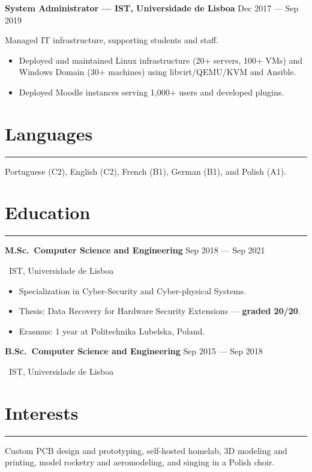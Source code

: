 \documentclass[11pt,a4paper]{article}
\begin{document}
\textbf{System Administrator --- IST, Universidade de Lisboa}
\hfill
Dec 2017 --- Sep 2019

Managed IT infrastructure, supporting students and staff.

\begin{itemize}[noitemsep]
  \item Deployed and maintained Linux infrastructure (20+ servers, 100+ VMs) and
  Windows Domain (30+ machines) using libvirt/QEMU/KVM and Ansible.
  \item Deployed Moodle instances serving 1,000+ users and developed
  plugins.
\end{itemize}

\section*{Languages}

\hrule

Portuguese (C2), English (C2), French (B1), German (B1), and Polish (A1).

\section*{Education}

\hrule

\textbf{M.Sc.\ Computer Science and Engineering}
\hfill
Sep 2018 --- Sep 2021

\faUniversity\ IST, Universidade de Lisboa

\begin{itemize}[noitemsep]
  \item Specialization in Cyber-Security and Cyber-physical Systems.
  \item Thesis: Data Recovery for Hardware Security Extensions ---
  \textbf{graded 20/20}.
  \item Erasmus: 1 year at Politechnika Lubelska, Poland.
\end{itemize}

\textbf{B.Sc.\ Computer Science and Engineering}
\hfill
Sep 2015 --- Sep 2018

\faUniversity\ IST, Universidade de Lisboa

\section*{Interests}

\hrule

Custom PCB design and prototyping, self-hosted homelab, 3D modeling and
printing, model rocketry and aeromodeling, and singing in a Polish choir.
\end{document}
